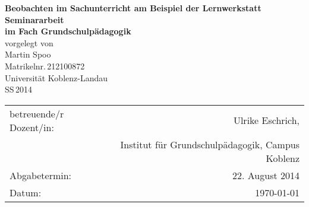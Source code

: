 \begin{titlepage}
	\begin{center}
		\quad
		\vfill
		\Huge{
			 \textbf{Beobachten im Sachunterricht am Beispiel der Lernwerkstatt}
		}
		\vspace{5mm}
		\vfill
		\large{
			{\bf Seminararbeit\\
			im Fach Grundschulpädagogik}
		}
		\\
		\vspace{0.5cm}
		\large{
			{vorgelegt von\\
			Martin Spoo\\
			Matrikelnr.\,212100872}
		}
		\vspace{1cm}
		\\
		\Large{
			{Universität Koblenz-Landau}\\
			{SS\,2014}
		}
		\vspace{1cm}
		\begin{table}[b]
			\begin{center}
				\begin{tabular}{lr}
					betreuende/r Dozent/in: & Ulrike Eschrich, \\
								&	Institut für Grundschulpädagogik, Campus Koblenz \\
					\vspace{0.5cm}
					Abgabetermin: & 22. August 2014 \\
					Datum: & \today
				\end{tabular}
			\end{center}
		\end{table}
	\end{center}
\end{titlepage}
\renewcommand{\baselinestretch}{1.1}
\restoregeometry

